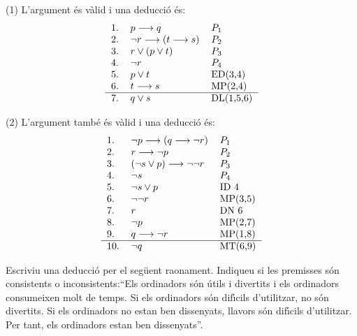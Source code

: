 \begin{solucio}
(1) L'argument \'{e}s v\`{a}lid i una deducci\'{o} \'{e}s:
\[%
\begin{tabular}
[c]{lll}%
1. & $p\longrightarrow q$ & $P_{1}$\\
2. & $\lnot r\longrightarrow\left(  t\longrightarrow s\right)  $ & $P_{2}$\\
3. & $r\vee\left(  p\vee t\right)  $ & $P_{3}$\\
4. & $\lnot r$ & $P_{4}$\\
5. & $p\vee t$ & ED(3,4)\\
6. & $t\longrightarrow s$ & MP(2,4)\\\hline
7. & $q\vee s$ & DL(1,5,6)
\end{tabular}
\]


(2) L'argument tamb\'{e} \'{e}s v\`{a}lid i una deducci\'{o} \'{e}s:%
\[%
\begin{tabular}
[c]{lll}%
1. & $\lnot p\longrightarrow\left(  q\longrightarrow\lnot r\right)  $ &
$P_{1}$\\
2. & $r\longrightarrow\lnot p$ & $P_{2}$\\
3. & $\left(  \lnot s\vee p\right)  \longrightarrow\lnot\lnot r$ & $P_{3}$\\
4. & $\lnot s$ & $P_{4}$\\
5. & $\lnot s\vee p$ & ID 4\\
6. & $\lnot\lnot r$ & MP(3,5)\\
7. & $r$ & DN 6\\
8. & $\lnot p$ & MP(2,7)\\
9. & $q\longrightarrow\lnot r$ & MP(1,8)\\\hline
10. & $\lnot q$ & MT(6,9)
\end{tabular}
\]

\end{solucio}

\begin{exer}
Escriviu una deducci\'{o} per el seg\"{u}ent raonament. Indiqueu si les
premisses s\'{o}n consistents o inconsistents:\textquotedblleft Els ordinadors
s\'{o}n \'{u}tils i divertits i els ordinadors consumeixen molt de temps. Si
els ordinadors s\'{o}n dif\'{\i}cils d'utilitzar, no s\'{o}n divertits. Si els
ordinadors no estan ben dissenyats, llavors s\'{o}n dif\'{\i}cils d'utilitzar.
Per tant, els ordinadors estan ben dissenyats\textquotedblright.
\end{exer}

